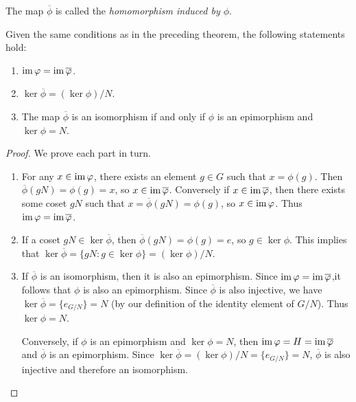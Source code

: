 \begin{remark}
    The map \(\overline{\phi}\) is called the \emph{homomorphism induced by \(\phi\)}.
\end{remark}

\begin{theorem}
    Given the same conditions as in the preceding theorem, the following statements hold:
    \begin{enumerate}[label=(\alph*)]
        \item \(\operatorname{im} \varphi = \operatorname{im} \overline{\varphi}\).
        \item \(\ker \overline{\phi} = (\ker \phi)/N\).
        \item The map \(\overline{\phi}\) is an isomorphism if and only if \(\phi\) is an epimorphism and \(\ker \phi = N\).
    \end{enumerate}
\end{theorem}

\begin{proof}
    We prove each part in turn.

    \begin{enumerate}[label=(\alph*), wide]
        \item For any \(x \in \operatorname{im} \varphi\), there exists an element \(g \in G\) such that \(x = \phi(g)\). Then \(\overline{\phi}(gN) = \phi(g) = x\), so \(x \in \operatorname{im} \overline{\varphi}\). Conversely if \(x \in \operatorname{im} \overline{\varphi}\), then there exists some coset \(gN\) such that \(x = \overline{\phi}(gN) = \phi(g)\), so \(x \in \operatorname{im} \varphi\). Thus \(\operatorname{im} \varphi = \operatorname{im} \overline{\varphi}\).
        
        \item If a coset \(gN \in \ker \overline{\phi}\), then \(\overline{\phi}(gN) = \phi(g) = e\), so \(g \in \ker \phi\). This implies that \(\ker \overline{\phi} = \{gN : g \in \ker \phi\} = (\ker \phi)/N\).
        
        \item If \(\overline{\phi}\) is an isomorphism, then it is also an epimorphism. Since \(\operatorname{im} \varphi = \operatorname{im} \overline{\varphi}\),it follows that \(\phi\) is also an epimorphism. Since \(\overline{\phi}\) is also injective, we have \(\ker \overline{\phi} = \{e_{G/N}\} = N\) (by our definition of the identity element of \(G/N\)). Thus \(\ker \phi = N\).
        
        Conversely, if \(\phi\) is an epimorphism and \(\ker \phi = N\), then \(\operatorname{im} \varphi = H = \operatorname{im} \overline{\varphi}\) and \(\overline{\phi}\) is an epimorphism. Since \(\ker \overline{\phi} = (\ker \phi)/N = \{e_{G/N}\} = N\), \(\overline{\phi}\) is also injective and therefore an isomorphism.
    \end{enumerate}
\end{proof}


